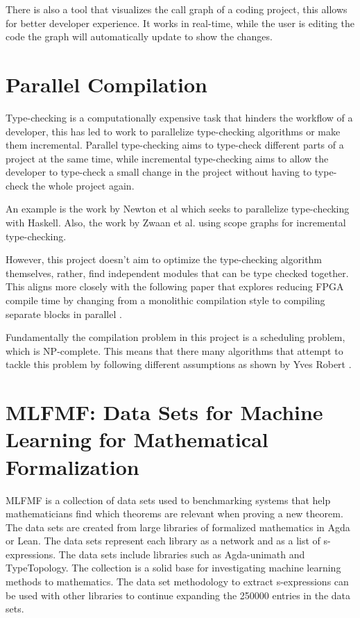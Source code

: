 There is also a tool \cite{call_graph_vis} that visualizes the call graph of a
coding project, this allows for better developer experience. It works in
real-time, while the user is editing the code the graph will automatically
update to show the changes.

\section{Parallel Compilation}

Type-checking is a computationally expensive task that hinders the workflow of
a developer, this has led to work to parallelize type-checking algorithms or
make them incremental. Parallel type-checking aims to type-check different
parts of a project at the same time, while incremental type-checking aims to
allow the developer to type-check a small change in the project without having
to type-check the whole project again.

An example is the work by Newton et al \cite{paralele_comp_haskell} which seeks to
parallelize type-checking with Haskell. Also, the work by Zwaan et al.
\cite{incremental_type_checking} using scope graphs for incremental
type-checking.

However, this project doesn't aim to optimize the type-checking algorithm
themselves, rather, find independent modules that can be type checked together.
This aligns more closely with the following paper that explores reducing FPGA
compile time by changing from a monolithic compilation style to compiling
separate blocks in parallel \cite{FPGA}.

Fundamentally the compilation problem in this project is a scheduling problem,
which is NP-complete\cite{scheduling}. This means that there many algorithms
that attempt to tackle this problem by following different assumptions as shown
by Yves Robert \cite{scheduling}.



\section{MLFMF: Data Sets for Machine Learning for Mathematical Formalization}

MLFMF is a collection of data sets used to benchmarking systems that help
mathematicians find which theorems are relevant when proving a new theorem. The
data sets are created from large libraries of formalized mathematics in Agda or
Lean. The data sets represent each library as a network and as a list of
s-expressions. The data sets include libraries such as Agda-unimath and
TypeTopology. The collection is a solid base for investigating machine learning
methods to mathematics. The data set methodology to extract s-expressions can
be used with other libraries to continue expanding the 250000 entries in the
data sets.

